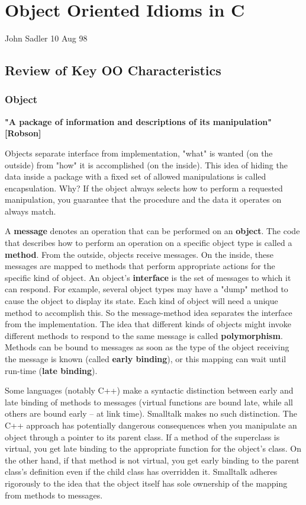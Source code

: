 \chapter{Object Oriented Idioms in C}
John Sadler
10 Aug 98
\section{Review of Key OO Characteristics}
\subsection{Object}
\textbf{"A package of information and descriptions of its manipulation"
[Robson]}

Objects separate interface from implementation, "what" is wanted (on
the outside) from "how" it is accomplished (on the inside). This idea
of hiding the data inside a package with a fixed set of allowed
manipulations is called encapsulation. Why? If the object always selects
how to perform a requested manipulation, you guarantee that the
procedure and the data it operates on always match.

A \textbf{message} denotes an operation that can be performed on an
\textbf{object}. The code that describes how to perform an operation on
a specific object type is called a \textbf{method}. From the outside,
objects receive messages. On the inside, these messages are mapped to
methods that perform appropriate actions for the specific kind of object.
An object’s \textbf{interface} is the set of messages to which it can
respond. For example, several object types may have a "dump" method to
cause the object to display its state. Each kind of object will need a
unique method to accomplish this. So the message-method idea separates
the interface from the implementation. The idea that different kinds of
objects might invoke different methods to respond to the same message is
called \textbf{polymorphism}. Methods can be bound to messages as soon
as the type of the object receiving the message is known (called
\textbf{early binding}), or this mapping can wait until run-time
(\textbf{late binding}).

Some languages (notably C++) make a syntactic distinction between early
and late binding of methods to messages (virtual functions are bound
late, while all others are bound early – at link time). Smalltalk makes
no such distinction. The C++ approach has potentially dangerous
consequences when you manipulate an object through a pointer to its
parent class. If a method of the superclass is virtual, you get late
binding to the appropriate function for the object’s class. On the other
hand, if that method is not virtual, you get early binding to the parent
class’s definition even if the child class has overridden it. Smalltalk
adheres rigorously to the idea that the object itself has sole ownership
of the mapping from methods to messages. 


